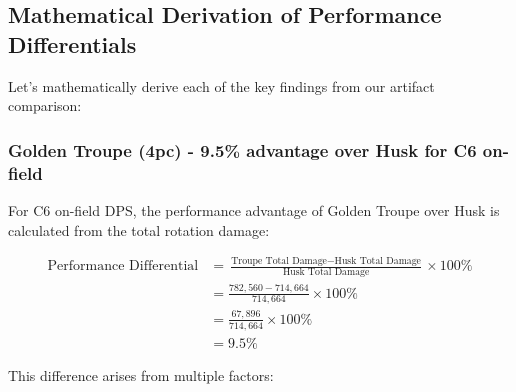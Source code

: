 \documentclass[12pt,a4paper]{article}
\begin{document}
\subsection{Mathematical Derivation of Performance Differentials}

Let's mathematically derive each of the key findings from our artifact comparison:

\subsubsection{Golden Troupe (4pc) - 9.5\% advantage over Husk for C6 on-field}

For C6 on-field DPS, the performance advantage of Golden Troupe over Husk is calculated from the total rotation damage:

\begin{align}
\text{Performance Differential} &= \frac{\text{Troupe Total Damage} - \text{Husk Total Damage}}{\text{Husk Total Damage}} \times 100\% \\
&= \frac{782,560 - 714,664}{714,664} \times 100\% \\
&= \frac{67,896}{714,664} \times 100\% \\
&= 9.5\%
\end{align}

This difference arises from multiple factors:
\end{document}
